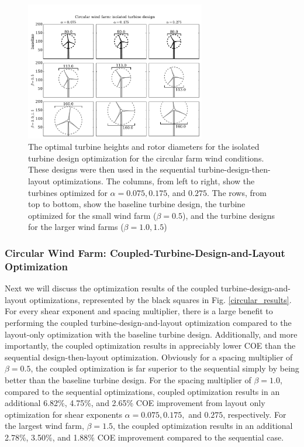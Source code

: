 \documentclass[WESD, manuscript]{copernicus}
\begin{document}
\begin{figure}[htbp]
  \centering
  \includegraphics[trim={0.5cm 0.3cm 0.3cm 2.75cm},clip,width=0.7\textwidth]{Figures/turbineSizesCircular_sequential.pdf}
  \caption{\label{circular_turbines_seq} The optimal turbine heights and rotor diameters for the isolated turbine design optimization for the circular farm wind conditions. These designs were then used in the sequential turbine-design-then-layout optimizations. The columns, from left to right, show the turbines optimized for $\alpha=0.075,0.175$, and $0.275$. The rows, from top to bottom, show the baseline turbine design, the turbine optimized for the small wind farm ($\beta=0.5$), and the turbine designs for the larger wind farms ($\beta=1.0,1.5$)}
\end{figure}



\subsubsection{Circular Wind Farm: Coupled-Turbine-Design-and-Layout Optimization}
Next we will discuss the optimization results of the coupled turbine-design-and-layout optimizations, represented by the black squares in Fig. \ref{circular_results}. For every shear exponent and spacing multiplier, there is a large benefit to performing the coupled turbine-design-and-layout optimization compared to the layout-only optimization with the baseline turbine design. Additionally, and more importantly, the coupled optimization results in appreciably lower COE than the sequential design-then-layout optimization. Obviously for a spacing multiplier of $\beta=0.5$, the coupled optimization is far superior to the sequential simply by being better than the baseline turbine design. For the spacing multiplier of $\beta=1.0$, 
compared to the sequential optimizations, coupled optimization results in an additional 6.82\%, 4.75\%, and 2.65\% COE improvement from layout only optimization for shear exponents $\alpha=0.075, 0.175,$ and $0.275$, respectively. For the largest wind farm, $\beta=1.5$, the coupled optimization results in an additional 2.78\%, 3.50\%, and 1.88\% COE improvement compared to the sequential case. 
\end{document}
